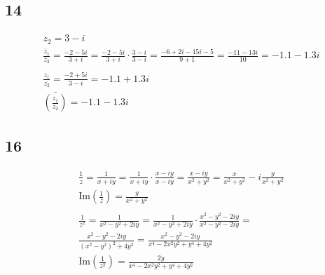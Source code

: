 \subsection*{14}


\begin{gather*}
	z_2 = 3 - i
	\\
	\frac{\bar z_1}{\bar z_2}
	=
	\frac{-2 - 5 i}{3 + i}
	=
	\frac{-2 - 5 i}{3 + i} \cdot \frac{3 - i}{3 - i}
	=
	\frac{-6 + 2 i - 15 i - 5}{9 + 1}
	=
	\frac{-11 - 13 i}{10} = -1.1 - 1.3 i
	\\
	\\
	\frac{z_1}{z_2}
	=
	\frac{-2 + 5 i}{3 - i} = -1.1 + 1.3 i
	\\
	\bar{\left(\frac{z_1}{z_2}\right)} = -1.1 - 1.3 i
\end{gather*}


\subsection*{16}


\begin{gather*}
	\frac{1}{z} = \frac{1}{x + i y}
	=
	\frac{1}{x + i y} \cdot \frac{x - i y}{x - i y}
	=
	\frac{x - i y}{x^2 + y^2}
	=
	\frac{x}{x^2 + y^2} - i \frac{y}{x^2 + y^2}
	\\
	\text{Im}\left(\frac{1}{z}\right) = \frac{y}{x^2 + y^2}
	\\
	\\
	\frac{1}{z^2} = \frac{1}{x^2 - y^2 + 2 i y}
	=
	\frac{1}{x^2 - y^2 + 2 i y} \cdot \frac{x^2 - y^2 - 2 i y}{x^2 - y^2 - 2 i y}
	=
	\\
	\frac{x^2 - y^2 - 2 i y}{\left(x^2 - y^2\right)^2 + 4 y^2}
	=
	\frac{x^2 - y^2 - 2 i y}{x^4 - 2 x^2 y^2 + y^4 + 4 y^2}
	\\
	\text{Im}\left(\frac{1}{z^2}\right) = \frac{2 y}{x^4 - 2 x^2 y^2 + y^4 + 4 y^2}
\end{gather*}

